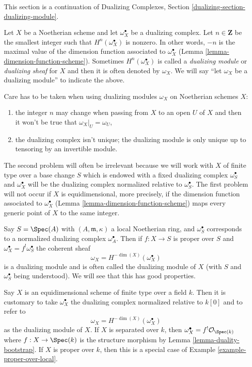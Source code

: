 \noindent
This section is a continuation of
Dualizing Complexes, Section \ref{dualizing-section-dualizing-module}.

\medskip\noindent
Let $X$ be a Noetherian scheme and let $\omega_X^\bullet$ be a
dualizing complex. Let $n \in \mathbf{Z}$ be the smallest integer such that
$H^n(\omega_X^\bullet)$ is nonzero. In other words, $-n$ is the maximal
value of the dimension function associated to $\omega_X^\bullet$
(Lemma \ref{lemma-dimension-function-scheme}).
Sometimes $H^n(\omega_X^\bullet)$
is called a {\it dualizing module} or {\it dualizing sheaf}
for $X$ and then it is often denoted
by $\omega_X$. We will say ``let $\omega_X$ be a dualizing module''
to indicate the above.

\medskip\noindent
Care has to be taken when using dualizing modules $\omega_X$ on Noetherian
schemes $X$:
\begin{enumerate}
\item the integer $n$ may change when passing from $X$ to an open $U$
of $X$ and then it won't be true that $\omega_X|_U = \omega_U$,
\item the dualizing complex isn't unique; the dualizing module
is only unique up to tensoring by an invertible module.
\end{enumerate}
The second problem will often be irrelevant because we will work
with $X$ of finite type over a base change $S$ which is
endowed with a fixed dualizing complex $\omega_S^\bullet$ and
$\omega_X^\bullet$ will be the dualizing complex normalized relative
to $\omega_S^\bullet$.
The first problem will not occur if $X$ is equidimensional, more precisely,
if the dimension function associated to $\omega_X^\bullet$
(Lemma \ref{lemma-dimension-function-scheme})
maps every generic point of $X$ to the same integer.

\begin{example}
\label{example-proper-over-local}
Say $S = \Spec(A)$ with $(A, \mathfrak m, \kappa)$
a local Noetherian ring, and $\omega_S^\bullet$ corresponds to
a normalized dualizing complex $\omega_A^\bullet$. Then if
$f : X \to S$ is proper over $S$ and $\omega_X^\bullet = f^!\omega_S^\bullet$
the coherent sheaf
$$
\omega_X = H^{-\dim(X)}(\omega_X^\bullet)
$$
is a dualizing module and is often called the dualizing module
of $X$ (with $S$ and $\omega_S^\bullet$ being understood). We will
see that this has good properties.
\end{example}

\begin{example}
\label{example-equidimensional-over-field}
Say $X$ is an equidimensional scheme of finite type
over a field $k$. Then it is customary to take
$\omega_X^\bullet$ the dualizing complex normalized relative to $k[0]$
and to refer to
$$
\omega_X = H^{-\dim(X)}(\omega_X^\bullet)
$$
as the dualizing module of $X$. If $X$ is separated over $k$, then
$\omega_X^\bullet = f^!\mathcal{O}_{\Spec(k)}$ where
$f : X \to \Spec(k)$ is the structure morphism by
Lemma \ref{lemma-duality-bootstrap}. If $X$ is proper over $k$, then
this is a special case of Example \ref{example-proper-over-local}.
\end{example}

